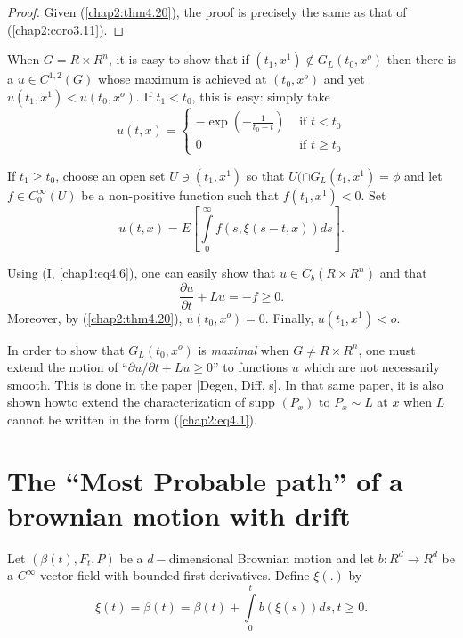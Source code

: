 \begin{proof}
Given (\ref{chap2:thm4.20}), the proof is precisely the same as that
of (\ref{chap2:coro3.11}).  
\end{proof}


\setcounter{remark}{21}
\begin{remark} %
When $G= R \times R^n$, it is easy to show that if $(t_1, x^1) \notin
G_L(t_0,x^o)$ then there is a $u \in C^{1,2}(G)$ whose maximum is achieved at
$(t_0,x^o)$ and yet $u(t_1 , x^1) < u(t_0, x^o)$. If $t_1 < t_0$, this
is easy: simply take 
\begin{equation*}
u(t,x)=
\begin{cases}
 - \exp (-\frac{1}{t_0 -t}) &\text{ if } t < t_0\\[4pt]
 0 & \text{ if } t \ge t_0
\end{cases}
\end{equation*}

If $t_1 \ge t_0$, choose an open set $U \ni(t_1, x^1)$ so that  $U(
\cap G_L(t_1, x^1)= \phi$ and let $f \in  C^\infty_0(U)$ be a
non-positive function such that $f(t_1, x^1) < 0$. Set 
$$
u (t,x)= E [ \int\limits_{0}^\infty f(s, \xi(s-t,x)) ds]. 
$$

Using (I, \ref{chap1:eq4.6}), one can easily show that $u \in  C_b(R
\times R^n)$ and that   
$$
\frac{\partial u}{\partial t} +Lu =-f \ge 0. 
$$ 
Moreover, by (\ref{chap2:thm4.20}), $u(t_0, x^o)=0$. Finally, $u(t_1, 
x^1)< o$.    

In order to show that $G_L(t_0, x^o)$ is \textit{maximal} when $G \neq
R \times R^n$, one must extend the notion of ``$\partial u / \partial
t + Lu \ge 0$'' to functions $u$ which are not necessarily
smooth. This is done in the paper [Degen, Diff, s]. In that same
paper, it is also shown how\pageoriginale to extend the
characterization of supp $(P_x)$ to $P_x \sim L$ at $x$ when $L$
cannot be written in the form (\ref{chap2:eq4.1}).    
\end{remark}


\section{The ``Most Probable path'' of a brownian motion with drift}

Let $(\beta(t), F_t, P)$ be a $d-$dimensional Brownian motion and
let $b: R^d \to R^d$ be a $C^\infty$-vector field with bounded first
derivatives. Define $\xi(.)$ by   
\begin{equation*}
\xi(t) = \beta(t) = \beta(t) + \int\limits_{0}^t b(\xi(s)) ds, t \ge
0. \tag{5.1}\label{chap2:eq5.1} 
\end{equation*}

